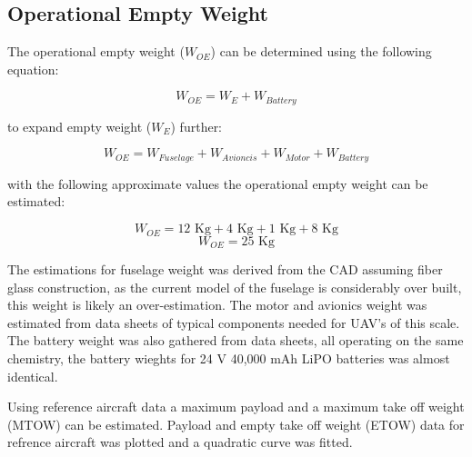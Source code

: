\documentclass[12pt]{article}
\begin{document}
	
	
	\subsection{Operational Empty Weight}
	The operational empty weight (\(W_{OE}\)) can be determined using the following equation:
	
	\begin{equation}
		W_{OE} = W_{E} + W_{Battery}
	\end{equation}
	
	to expand empty weight ($W_{E}$) further:
	
	\begin{equation}
		W_{OE} = W_{Fuselage} + W_{Avioncis} + W_{Motor} + W_{Battery}
	\end{equation}
	
	with the following approximate values the operational empty weight can be estimated:
	
	\begin{equation}
		W_{OE} = 12\text{ Kg} + 4\text{ Kg} + 1\text{ Kg} + 8\text{ Kg}
	\end{equation}
	\begin{equation}
		W_{OE} = 25\text{ Kg}
	\end{equation}
		
	The estimations for fuselage weight was derived from the CAD assuming fiber glass construction, as the current model of the fuselage is considerably over built, this weight is likely an over-estimation. The motor and avionics weight was estimated from data sheets of typical components needed for UAV's of this scale. The battery weight was also gathered from data sheets, all operating on the same chemistry, the battery wieghts for 24 V 40,000 mAh LiPO batteries was almost identical.
	
	Using reference aircraft data a maximum payload and a maximum take off weight (MTOW) can be estimated. Payload and empty take off weight (ETOW) data for refrence aircraft was plotted and a quadratic curve was fitted.
	
\end{document}
